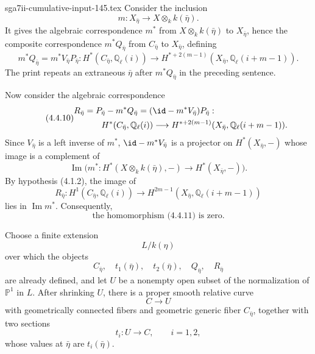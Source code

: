 \begin{filecontents*}{sga7ii-cumulative-input-145.tex}
Consider the inclusion
\begin{equation*}
m:X_{\bar\eta}\longrightarrow X\otimes_k k(\bar\eta).
\end{equation*}
It gives the algebraic correspondence $m^*$ from
$X\otimes_k k(\bar\eta)$ to $X_{\bar\eta}$, hence the composite
correspondence $m^*Q_{\bar\eta}$ from $C_{\bar\eta}$ to
$X_{\bar\eta}$, defining
\begin{equation}\tag{4.4.9}
m^*Q_{\bar\eta}=m^*V_{\bar\eta}P_{\bar\eta}:
H^*(C_{\bar\eta},\mathbb Q_\ell(i))
\longrightarrow
H^{*+2(m-1)}(X_{\bar\eta},\mathbb Q_\ell(i+m-1)).
\end{equation}
The print repeats an extraneous $\bar\eta$ after $m^*Q_{\bar\eta}$ in
the preceding sentence.

Now consider the algebraic correspondence
\begin{equation}\tag{4.4.10}
\begin{split}
R_{\bar\eta}
&=P_{\bar\eta}-m^*Q_{\bar\eta}
=(\id-m^*V_{\bar\eta})P_{\bar\eta}:\\
&\hspace{2em}H^*(C_{\bar\eta},\mathbb Q_\ell(i))
\longrightarrow
H^{*+2(m-1)}(X_{\bar\eta},\mathbb Q_\ell(i+m-1)).
\end{split}
\end{equation}
Since $V_{\bar\eta}$ is a left inverse of $m^*$,
$\id-m^*V_{\bar\eta}$ is a projector on $H^*(X_{\bar\eta},-)$ whose
image is a complement of
\begin{equation*}
\operatorname{Im}\bigl(m^*:H^*(X\otimes_k k(\bar\eta),-)
\longrightarrow H^*(X_{\bar\eta},-)\bigr).
\end{equation*}
By hypothesis (4.1.2), the image of
\begin{equation}\tag{4.4.11}
R_{\bar\eta}:H^1(C_{\bar\eta},\mathbb Q_\ell(i))
\longrightarrow
H^{2m-1}(X_{\bar\eta},\mathbb Q_\ell(i+m-1))
\end{equation}
lies in $\operatorname{Im}m^*$.  Consequently,
\begin{equation}\tag{4.4.12}
\text{the homomorphism (4.4.11) is zero.}
\end{equation}

Choose a finite extension
\begin{equation*}
L/k(\eta)
\end{equation*}
over which the objects
\begin{equation*}
C_{\bar\eta},\quad t_1(\bar\eta),\quad t_2(\bar\eta),\quad
Q_{\bar\eta},\quad R_{\bar\eta}
\end{equation*}
are already defined, and let $U$ be a nonempty open subset of the
normalization of $\mathbb P^1$ in $L$.  After shrinking $U$, there is a
proper smooth relative curve
\begin{equation*}
C\longrightarrow U
\end{equation*}
with geometrically connected fibers and geometric generic fiber
$C_{\bar\eta}$, together with two sections
\begin{equation*}
t_i:U\longrightarrow C,\qquad i=1,2,
\end{equation*}
whose values at $\bar\eta$ are $t_i(\bar\eta)$.


\end{filecontents*}
